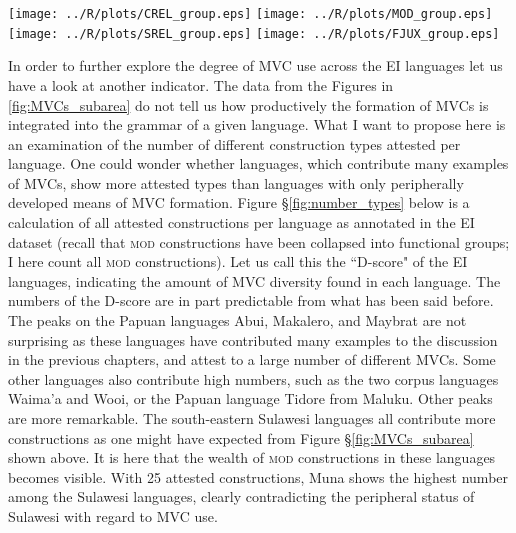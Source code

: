 \begin{sidewaysfigure}
\begin{minipage}{1.0\textwidth}
\texttt{[image: ../R/plots/CREL\_group.eps]}
\texttt{[image: ../R/plots/MOD\_group.eps]}
\texttt{[image: ../R/plots/SREL\_group.eps]}
\texttt{[image: ../R/plots/FJUX\_group.eps]}
\caption[MVCs per subarea in percent]{MVCs per subarea in percent. This is a composite of Figures \ref{fig:crel-group}, \ref{fig:mod-group}, \ref{fig:srel-group} and \ref{fig:fjux-group} from chapter \ref{ch:constructions}. \textsc{crel} = component-relating constructions, \textsc{srel} = stage-relating constructions, \textsc{mod} = modifying constructions, \textsc{fjux} = free juxtaposition constructions. Numbers on top of the bars refer to the number of occurrences.}\label{fig:MVCs_subarea}
\end{minipage}
\end{sidewaysfigure}


In order to further explore the degree of MVC use across the EI languages let us have a look at another indicator. The data from the Figures in \ref{fig:MVCs_subarea} do not tell us how productively the formation of MVCs is integrated into the grammar of a given language. What I want to propose here is an examination of the number of different construction types attested per language. One could wonder whether languages, which contribute many examples of MVCs, show more attested types than languages with only peripherally developed means of MVC formation. Figure §\ref{fig:number_types} below is a calculation of all attested constructions per language as annotated in the EI dataset (recall that \textsc{mod} constructions have been collapsed into functional groups; I here count all \textsc{mod} constructions). Let us call this the ``D-score" of the EI languages, indicating the amount of MVC diversity found in each language. The numbers of the D-score are in part predictable from what has been said before. The peaks on the Papuan languages Abui, Makalero, and Maybrat are not surprising as these languages have contributed many examples to the discussion in the previous chapters, and attest to a large number of different MVCs. Some other languages also contribute high numbers, such as the two corpus languages Waima'a and Wooi, or the Papuan language Tidore from Maluku. Other peaks are more remarkable. The south-eastern Sulawesi languages all contribute more constructions as one might have expected from Figure §\ref{fig:MVCs_subarea} shown above. It is here that the wealth of \textsc{mod} constructions in these languages becomes visible. With 25 attested constructions, Muna shows the highest number among the Sulawesi languages, clearly contradicting the peripheral status of Sulawesi with regard to MVC use.

